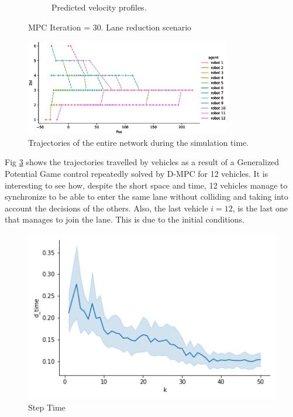\begin{figure}[H]
\begin{subfigure}[b]{0.45\textwidth}
    \caption{Predicted velocity profiles.}
    \label{fig:third}
\end{subfigure}
\caption{MPC Iteration = 30. Lane reduction scenario}
\label{fig:figures}
\end{figure}
\begin{figure}[H]
\centering
    \includegraphics[width=0.8\textwidth]{Kap6/red_lane/red_lane_trajectories.eps}
    \caption{Trajectories of the entire network during the simulation time.}
    \label{red_lane_traject}
\end{figure}


Fig \ref{red_lane_traject} shows the trajectories travelled by vehicles as a result of a Generalized Potential Game control repeatedly solved by D-MPC for 12 vehicles. It is interesting to see how, despite the short space and time, 12 vehicles manage to synchronize to be able to enter the same lane without colliding and taking into account the decisions of the others. Also, the last vehicle $i=12$, is the last one that manages to join the lane. This is due to the initial conditions.



\begin{figure}[H]
\centering
    \includegraphics[width=.6\textwidth]{Kap6/red_lane/red_lane_d_time.png}
    \caption{Step Time}
    \label{red_lane_step_time}
\end{figure}

